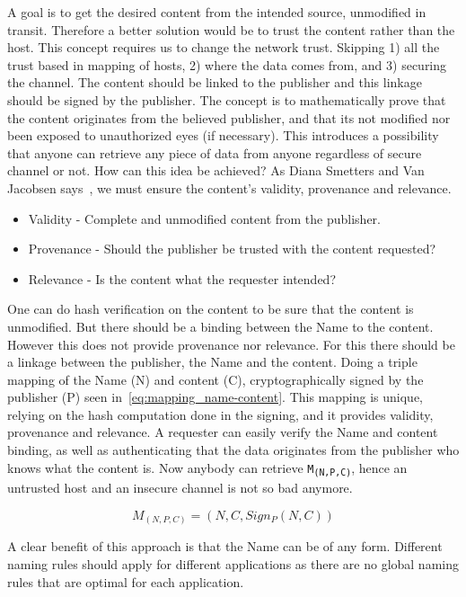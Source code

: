 A goal is to get the desired content from the intended source, unmodified in transit.
Therefore a better solution would be to trust the content rather than the host.
This concept requires us to change the network trust.
Skipping 1) all the trust based in mapping of hosts, 2) where the data comes from, and 3) securing the channel.
The content should be linked to the publisher and this linkage should be signed by the publisher. 
The concept is to mathematically prove that the content originates from the believed publisher, and that its not modified nor been exposed to unauthorized eyes (if necessary).
This introduces a possibility that anyone can retrieve any piece of data from anyone regardless of secure channel or not.
How can this idea be achieved? 
As Diana Smetters and Van Jacobsen says~\cite{secure-network-content}, we must ensure the content's validity, provenance and relevance.

\begin{itemize}
  \item Validity - Complete and unmodified content from the publisher.
  \item Provenance - Should the publisher be trusted with the content requested?
  \item Relevance - Is the content what the requester intended?
\end{itemize}

One can do hash verification on the content to be sure that the content is unmodified. 
But there should be a binding between the Name to the content.
However this does not provide provenance nor relevance.
For this there should be a linkage between the publisher, the Name and the content.
Doing a triple mapping of the Name (N) and content (C), cryptographically signed by the publisher (P) seen in~\autoref{eq:mapping_name-content}.
This mapping is unique, relying on the hash computation done in the signing, and it provides validity, provenance and relevance.
A requester can easily verify the Name and content binding, as well as authenticating that the data originates from the publisher who knows what the content is.
Now anybody can retrieve \texttt{M\textsubscript{(N,P,C)}}, hence an untrusted host and an insecure channel is not so bad anymore.

\begin{equation}\label{eq:mapping_name-content}
M_{(N, P, C)} = (N,C,Sign_{P}(N,C))
\end{equation}

A clear benefit of this approach is that the Name can be of any form. 
Different naming rules should apply for different applications as there are no global naming rules that are optimal for each application.

